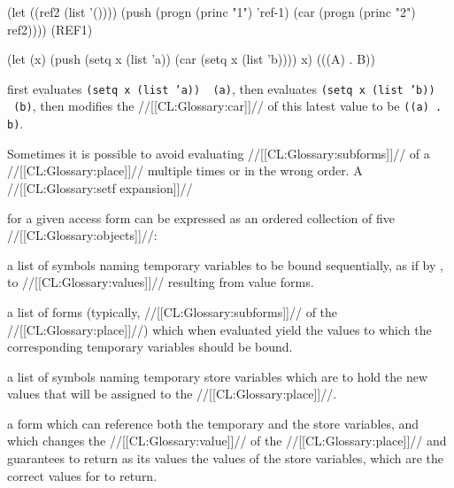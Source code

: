 
\code
 (let ((ref2 (list '())))
   (push (progn (princ "1") 'ref-1)
         (car (progn (princ "2") ref2)))) 
\EV (REF1)

 (let (x)
    (push (setq x (list 'a))
          (car (setq x (list 'b))))
     x)
\EV (((A) . B))
\endcode

 first evaluates {\tt (setq x (list 'a)) \EV\ (a)},
 then evaluates {\tt (setq x (list 'b)) \EV\ (b)},
 then modifies the //[[CL:Glossary:car]]// of this latest value to be {\tt ((a) . b)}.

\endsubsubsubsection%

\endsubsubsection%






Sometimes it is possible to avoid evaluating //[[CL:Glossary:subforms]]// of a 
//[[CL:Glossary:place]]// multiple times or in the wrong order.  A
//[[CL:Glossary:setf expansion]]//

for a given access form can be expressed as an ordered collection of five //[[CL:Glossary:objects]]//:






\beginlist


a list of symbols naming temporary variables to be bound
sequentially, as if by , to //[[CL:Glossary:values]]// 
resulting from value forms.
     

a list of forms (typically, //[[CL:Glossary:subforms]]// of the
//[[CL:Glossary:place]]//) which when evaluated 
yield the values to which the corresponding temporary 
variables should be bound.




a list of symbols naming temporary store variables which are
to hold the new values that will be assigned to the
//[[CL:Glossary:place]]//.



a form which can reference both the temporary and the store variables,
and which changes the //[[CL:Glossary:value]]// of the //[[CL:Glossary:place]]//
and guarantees to return as its values the values of the store variables,
which are the correct values for  to return.


